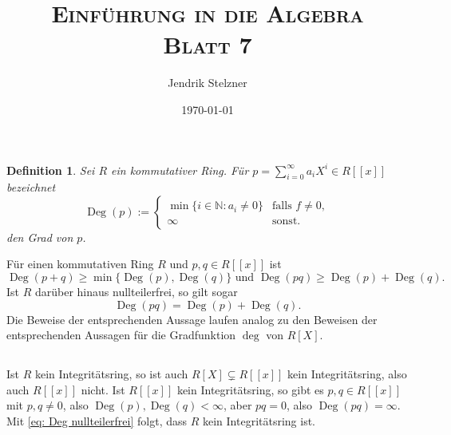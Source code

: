 \documentclass[a4paper,10pt]{article}
\title{\textsc{Einführung in die Algebra \\ \Large Blatt 7}}
\author{Jendrik Stelzner}
\date{\today}
\newtheorem*{defi}{Definition}
\newcommand{\N}{\mathbb{N}}
\newcommand{\Deg}{\operatorname{Deg}}
\begin{document}
\maketitle





\section{}





\section{}





\section{}





\section{}

\begin{defi}
Sei $R$ ein kommutativer Ring. Für $p = \sum_{i=0}^\infty a_i X^i \in R[\![x]\!]$ bezeichnet
\[
 \Deg(p) :=
 \begin{cases}
  \min \{i \in \N : a_i \neq 0\} & \text{falls } f \neq 0, \\
                          \infty & \text{sonst}.
 \end{cases}
\]
den Grad von $p$.
\end{defi}
Für einen kommutativen Ring $R$ und $p,q \in R[\![x]\!]$ ist
\begin{equation}\label{eq: Deg Ungleichungen}
 \Deg(p+q) \geq \min \{\Deg(p), \Deg(q)\} \text{ und }
 \Deg(pq) \geq \Deg(p) + \Deg(q).
\end{equation}
Ist $R$ darüber hinaus nullteilerfrei, so gilt sogar
\begin{equation}\label{eq: Deg nullteilerfrei}
 \Deg(pq) = \Deg(p) + \Deg(q).
\end{equation}
Die Beweise der entsprechenden Aussage laufen analog zu den Beweisen der entsprechenden Aussagen für die Gradfunktion $\deg$ von $R[X]$.


\subsection{}
Ist $R$ kein Integritätsring, so ist auch $R[X] \subsetneq R[\![x]\!]$ kein Integritätsring, also auch $R[\![x]\!]$ nicht. Ist $R[\![x]\!]$ kein Integritätsring, so gibt es $p, q \in R[\![x]\!]$ mit $p,q \neq 0$, also $\Deg(p), \Deg(q) < \infty$, aber $pq = 0$, also $\Deg(pq) = \infty$. Mit \eqref{eq: Deg nullteilerfrei} folgt, dass $R$ kein Integritätsring ist.
\end{document}
